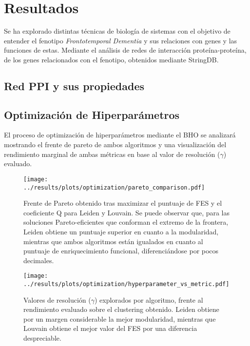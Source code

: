 \section{Resultados}
Se ha explorado distintas técnicas de biología de sistemas con el objetivo de entender el fenotipo \textit{Frontotemporal Dementia} y sus relaciones con genes y las funciones de estas. 
Mediante el análisis de redes de interacción proteína-proteína, de los genes relacionados con el fenotipo, obtenidos mediante StringDB.

\subsection{Red PPI y sus propiedades}



\subsection{Optimización de Hiperparámetros}

El proceso de optimización de hiperparámetros mediante el BHO se analizará mostrando el frente de pareto de ambos algoritmos y una visualización del rendimiento marginal de ambas métricas en base al valor de resolución (\(\gamma\)) evaluado.

\begin{figure}[htbp!]
	\centering
	\texttt{[image: ../results/plots/optimization/pareto\_comparison.pdf]}
	\caption{Frente de Pareto obtenido tras maximizar el puntuaje de FES y el coeficiente Q para Leiden y Louvain. Se puede observar que, para las soluciones Pareto-eficientes que conforman el extremo de la frontera, Leiden obtiene un puntuaje superior en cuanto a la modularidad, mientras que ambos algoritmos están igualados en cuanto al puntuaje de enriquecimiento funcional, diferenciándose por pocos decimales.}
	\label{fig:pareto}
\end{figure}

\begin{figure}[htbp!]
	\centering
	\texttt{[image: ../results/plots/optimization/hyperparameter\_vs\_metric.pdf]}
	\caption{Valores de resolución (\(\gamma\)) explorados por algoritmo, frente al rendimiento evaluado sobre el clustering obtenido. Leiden obtiene por un margen considerable la mejor modularidad, mientras que Louvain obtiene el mejor valor del FES por una diferencia despreciable.}
	\label{fig:slice_plot}
\end{figure}



